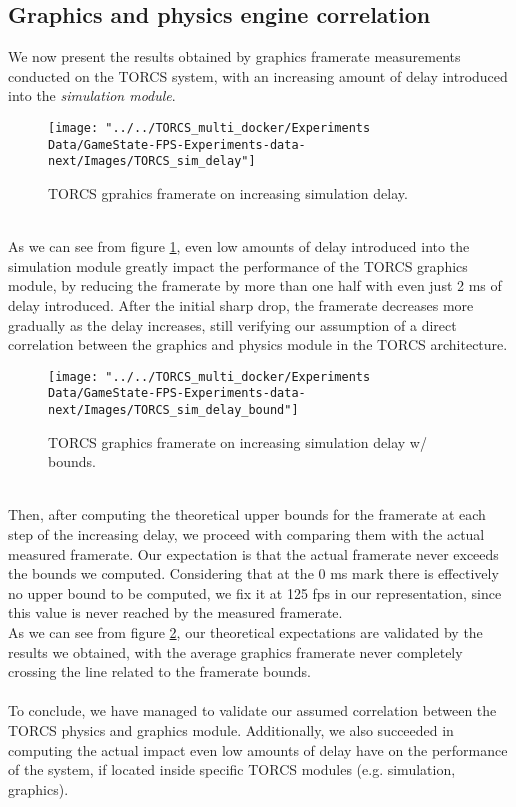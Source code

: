 \subsection{Graphics and physics engine correlation}\label{graphics-physics-experiment}
We now present the results obtained by graphics framerate measurements conducted on the TORCS system, with an increasing amount of delay introduced into the \textit{simulation module}.
\begin{figure}[h!]
	\centering
	\texttt{[image: "../../TORCS\_multi\_docker/Experiments Data/GameState-FPS-Experiments-data-next/Images/TORCS\_sim\_delay"]}
	\caption[TORCS graphics framerate on increasing simulation delay]{TORCS gprahics framerate on increasing simulation delay.}
	\label{fig:torcs-sim-delay}
\end{figure}
\\ As we can see from figure \ref{fig:torcs-sim-delay}, even low amounts of delay introduced into the simulation module greatly impact the performance of the TORCS graphics module, by reducing the framerate by more than one half with even just 2 ms of delay introduced. After the initial sharp drop, the framerate decreases more gradually as the delay increases, still verifying our assumption of a direct correlation between the graphics and physics module in the TORCS architecture.
\begin{figure}[h!]
	\centering
	\texttt{[image: "../../TORCS\_multi\_docker/Experiments Data/GameState-FPS-Experiments-data-next/Images/TORCS\_sim\_delay\_bound"]}
	\caption[TORCS graphics framerate on increasing simulation delay w/ bounds]{TORCS graphics framerate on increasing simulation delay w/ bounds.}
	\label{fig:torcs-sim-delay-bound}
\end{figure}
\\ Then, after computing the theoretical upper bounds for the framerate at each step of the increasing delay, we proceed with comparing them with the actual measured framerate. Our expectation is that the actual framerate never exceeds the bounds we computed. Considering that at the 0 ms mark there is effectively no upper bound to be computed, we fix it at 125 fps in our representation, since this value is never reached by the measured framerate. \\
As we can see from figure \ref{fig:torcs-sim-delay-bound}, our theoretical expectations are validated by the results we obtained, with the average graphics framerate never completely crossing the line related to the framerate bounds. \\ \\
To conclude, we have managed to validate our assumed correlation between the TORCS physics and graphics module. Additionally, we also succeeded in computing the actual impact even low amounts of delay have on the performance of the system, if located inside specific TORCS modules (e.g. simulation, graphics).

